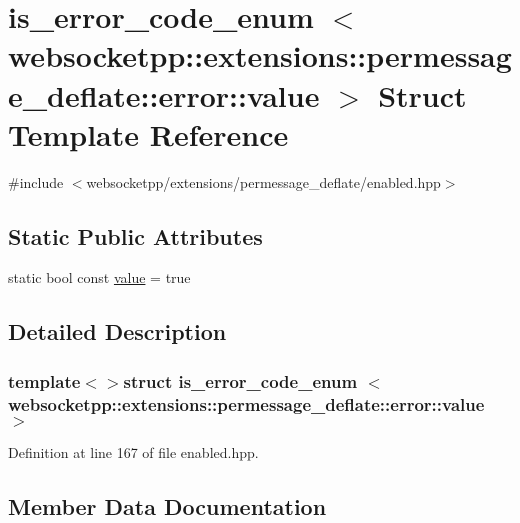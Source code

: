 \hypertarget{structis__error__code__enum_01_01_01_01_3_01websocketpp_1_1extensions_1_1permessage__deflate_1_1error_1_1value_01_4}{}\section{is\+\_\+error\+\_\+code\+\_\+enum $<$ websocketpp\+:\+:extensions\+:\+:permessage\+\_\+deflate\+:\+:error\+:\+:value $>$ Struct Template Reference}
\label{structis__error__code__enum_01_01_01_01_3_01websocketpp_1_1extensions_1_1permessage__deflate_1_1error_1_1value_01_4}


{\ttfamily \#include $<$websocketpp/extensions/permessage\+\_\+deflate/enabled.\+hpp$>$}

\subsection*{Static Public Attributes}
\begin{DoxyCompactItemize}
\item 
static bool const \hyperlink{structis__error__code__enum_01_01_01_01_3_01websocketpp_1_1extensions_1_1permessage__deflate_1_1error_1_1value_01_4_a40d6a9879d46788c2400b2152c808580}{value} = true
\end{DoxyCompactItemize}


\subsection{Detailed Description}
\subsubsection*{template$<$$>$struct is\+\_\+error\+\_\+code\+\_\+enum    $<$ websocketpp\+::extensions\+::permessage\+\_\+deflate\+::error\+::value $>$}



Definition at line 167 of file enabled.\+hpp.



\subsection{Member Data Documentation}
\hypertarget{structis__error__code__enum_01_01_01_01_3_01websocketpp_1_1extensions_1_1permessage__deflate_1_1error_1_1value_01_4_a40d6a9879d46788c2400b2152c808580}{}
